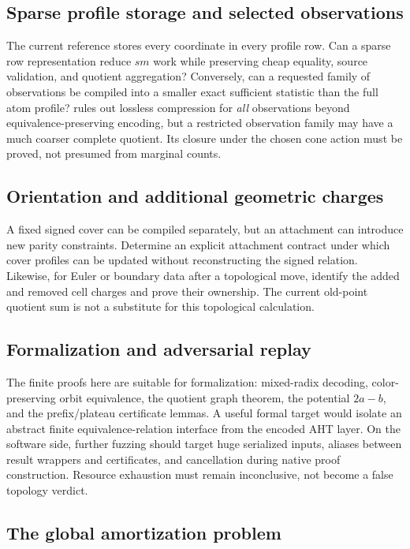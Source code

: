 \subsection{Sparse profile storage and selected observations}

The current reference stores every coordinate in every profile row. Can a
sparse row representation reduce $sm$ work while preserving cheap equality,
source validation, and quotient aggregation? Conversely, can a requested
family of observations be compiled into a smaller exact sufficient statistic
than the full atom profile?  rules out lossless
compression for \emph{all} observations beyond equivalence-preserving
encoding, but a restricted observation family may have a much coarser
complete quotient. Its closure under the chosen cone action must be proved,
not presumed from marginal counts.

\subsection{Orientation and additional geometric charges}

A fixed signed cover can be compiled separately, but an attachment can
introduce new parity constraints. Determine an explicit attachment contract
under which cover profiles can be updated without reconstructing the signed
relation. Likewise, for Euler or boundary data after a topological move,
identify the added and removed cell charges and prove their ownership.
The current old-point quotient sum is not a substitute for this topological
calculation.

\subsection{Formalization and adversarial replay}

The finite proofs here are suitable for formalization: mixed-radix decoding,
color-preserving orbit equivalence, the quotient graph theorem, the potential
$2a-b$, and the prefix/plateau certificate lemmas. A useful formal target
would isolate an abstract finite equivalence-relation interface from the
encoded AHT layer. On the software side, further fuzzing should target huge
serialized inputs, aliases between result wrappers and certificates, and
cancellation during native proof construction. Resource exhaustion must
remain inconclusive, not become a false topology verdict.

\subsection{The global amortization problem}

